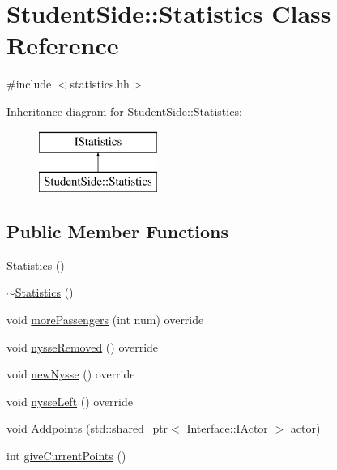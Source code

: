 \hypertarget{class_student_side_1_1_statistics}{\section{Student\-Side\-:\-:Statistics Class Reference}
\label{class_student_side_1_1_statistics}
}


{\ttfamily \#include $<$statistics.\-hh$>$}

Inheritance diagram for Student\-Side\-:\-:Statistics\-:\begin{figure}[H]
\begin{center}
\leavevmode
\includegraphics[height=2.000000cm]{class_student_side_1_1_statistics}
\end{center}
\end{figure}
\subsection*{Public Member Functions}
\begin{DoxyCompactItemize}
\item 
\hyperlink{class_student_side_1_1_statistics_a72567fde7744c67397c116f16fe57aed}{Statistics} ()
\item 
\hyperlink{class_student_side_1_1_statistics_aa49cd3fc5b2a5c4de8eea5ed690ffb77}{$\sim$\-Statistics} ()
\item 
void \hyperlink{class_student_side_1_1_statistics_a28c61977ebb56858f1cfe02ea58e22a5}{more\-Passengers} (int num) override
\item 
void \hyperlink{class_student_side_1_1_statistics_a95d0c05379ea6127c5d60b329e57bb97}{nysse\-Removed} () override
\item 
void \hyperlink{class_student_side_1_1_statistics_af7fbe87b0c1ae4bab650ba8c53a3f677}{new\-Nysse} () override
\item 
void \hyperlink{class_student_side_1_1_statistics_a2d7ba3c86539914571f493736d274ef0}{nysse\-Left} () override
\item 
void \hyperlink{class_student_side_1_1_statistics_ac111b2a2a9fc04b344eee9976c141d41}{Addpoints} (std\-::shared\-\_\-ptr$<$ Interface\-::\-I\-Actor $>$ actor)
\item 
int \hyperlink{class_student_side_1_1_statistics_a81dff48a0178f5f66c0b01def8afd788}{give\-Current\-Points} ()
\end{DoxyCompactItemize}


